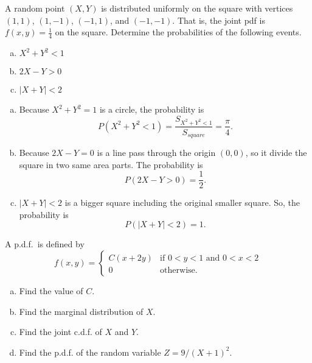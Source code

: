 \documentclass[14pt]{elegantbook}
\begin{document}


\setcounter{chapter}{7}

\chapter{}
    \setcounter{chapter}{4}

    \setcounter{exer}{0}
    \begin{exercise}
    A random point $(X, Y)$ is distributed uniformly on the square with vertices $(1, 1)$, $(1, -1)$, $(-1,1)$, and $(-1, -1)$. That is, the joint pdf is $f(x,y) = \frac{1}{4}$ on the square. Determine the probabilities of the following events. 
    \begin{enumerate}[(a)]
        \item $X^2+Y^2<1$
        \item $2X-Y>0$
        \item $|X+Y|<2$
    \end{enumerate}
    \end{exercise}

    \begin{solution}
        \begin{enumerate}[(a)]
            \item Because $X^2+Y^2=1$ is a circle, the probability is 
            \[P(X^2+Y^2<1)=\frac{S_{X^2+Y^2<1}}{S_{square}}=\frac{\pi}{4}. \]
            \item Because $2X-Y=0$ is a line pass through the origin $(0, 0)$, so it divide the square in two same area parts. The probability is 
            \[P(2X-Y>0)=\frac{1}{2}. \]
            \item $|X+Y|<2$ is a bigger square including the original smaller square. So, the probability is
            \[P(|X+Y|<2)=1. \]
        \end{enumerate}
    \end{solution}

    \setcounter{exer}{3}
    \begin{exercise}
        A p.d.f.\ is defined by 
        \[
            f(x,y)=\left\{
                \begin{array}{ll}
                    C(x+2y) & \text{if } 0<y<1\text{ and }0<x<2 \\
                    0 & \text{otherwise. }
                \end{array}
            \right.
        \]
        \begin{enumerate}[(a)]
            \item Find the value of $C$. 
            \item Find the marginal distribution of $X$. 
            \item Find the joint c.d.f. of $X$ and $Y$.
            \item Find the p.d.f. of the random variable $Z=9/(X+1)^2$. 
        \end{enumerate}
    \end{exercise}
\end{document}
